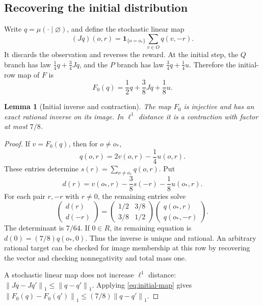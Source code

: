 \documentclass[11pt]{article}
\newtheorem{lemma}[theorem]{Lemma}
\theoremstyle{definition}
\theoremstyle{remark}
\newcommand{\one}{\mathbf 1}
\newcommand{\norm}[1]{\left\lVert#1\right\rVert}
\begin{document}
\subsection{Recovering the initial distribution}

Write $q=\mu(\cdot\mid\varnothing)$, and define the stochastic
linear map
\begin{equation}
  (Jq)(o,r)=\one_{\{o=o_*\}}\sum_{v\in O}q(v,-r).
  \label{eq:initial-reversal}
\end{equation}
It discards the observation and reverses the reward.  At the initial
step, the $Q$ branch has law $\tfrac14q+\tfrac34Jq$, and the $P$
branch has law $\tfrac34q+\tfrac14u$.  Therefore the initial-row map
of $F$ is
\begin{equation}
  F_0(q)=\frac12q+\frac38Jq+\frac18u.
  \label{eq:initial-map}
\end{equation}

\begin{lemma}[Initial inverse and contraction]
\label{lem:initial-inverse}
The map $F_0$ is injective and has an exact rational inverse on its
image.  In $\ell^1$ distance it is a contraction with factor at most
$7/8$.
\end{lemma}

\begin{proof}
If $v=F_0(q)$, then for $o\ne o_*$,
\[
  q(o,r)=2v(o,r)-\frac14u(o,r).
\]
These entries determine
$s(r)=\sum_{o\ne o_*}q(o,r)$.  Put
\[
  d(r)=v(o_*,r)-\frac38s(-r)-\frac18u(o_*,r).
\]
For each pair $r,-r$ with $r\ne0$, the remaining entries solve
\[
 \begin{pmatrix}d(r)\\d(-r)\end{pmatrix}
   =\begin{pmatrix}1/2&3/8\\3/8&1/2\end{pmatrix}
     \begin{pmatrix}q(o_*,r)\\q(o_*,-r)\end{pmatrix}.
\]
The determinant is $7/64$.  If $0\in R$, its remaining equation is
$d(0)=(7/8)q(o_*,0)$.  Thus the inverse is unique and rational.
An arbitrary rational target can be checked for image membership at
this row by recovering the vector and checking nonnegativity and
total mass one.

A stochastic linear map does not increase $\ell^1$ distance:
$\norm{Jq-Jq'}_1\le\norm{q-q'}_1$.  Applying
\eqref{eq:initial-map} gives
$\norm{F_0(q)-F_0(q')}_1\le(7/8)\norm{q-q'}_1$.
\end{proof}
\end{document}
